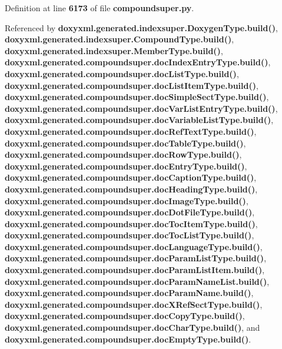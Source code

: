 Definition at line {\bf 6173} of file {\bf compoundsuper.\+py}.



Referenced by {\bf doxyxml.\+generated.\+indexsuper.\+Doxygen\+Type.\+build()}, {\bf doxyxml.\+generated.\+indexsuper.\+Compound\+Type.\+build()}, {\bf doxyxml.\+generated.\+indexsuper.\+Member\+Type.\+build()}, {\bf doxyxml.\+generated.\+compoundsuper.\+doc\+Index\+Entry\+Type.\+build()}, {\bf doxyxml.\+generated.\+compoundsuper.\+doc\+List\+Type.\+build()}, {\bf doxyxml.\+generated.\+compoundsuper.\+doc\+List\+Item\+Type.\+build()}, {\bf doxyxml.\+generated.\+compoundsuper.\+doc\+Simple\+Sect\+Type.\+build()}, {\bf doxyxml.\+generated.\+compoundsuper.\+doc\+Var\+List\+Entry\+Type.\+build()}, {\bf doxyxml.\+generated.\+compoundsuper.\+doc\+Variable\+List\+Type.\+build()}, {\bf doxyxml.\+generated.\+compoundsuper.\+doc\+Ref\+Text\+Type.\+build()}, {\bf doxyxml.\+generated.\+compoundsuper.\+doc\+Table\+Type.\+build()}, {\bf doxyxml.\+generated.\+compoundsuper.\+doc\+Row\+Type.\+build()}, {\bf doxyxml.\+generated.\+compoundsuper.\+doc\+Entry\+Type.\+build()}, {\bf doxyxml.\+generated.\+compoundsuper.\+doc\+Caption\+Type.\+build()}, {\bf doxyxml.\+generated.\+compoundsuper.\+doc\+Heading\+Type.\+build()}, {\bf doxyxml.\+generated.\+compoundsuper.\+doc\+Image\+Type.\+build()}, {\bf doxyxml.\+generated.\+compoundsuper.\+doc\+Dot\+File\+Type.\+build()}, {\bf doxyxml.\+generated.\+compoundsuper.\+doc\+Toc\+Item\+Type.\+build()}, {\bf doxyxml.\+generated.\+compoundsuper.\+doc\+Toc\+List\+Type.\+build()}, {\bf doxyxml.\+generated.\+compoundsuper.\+doc\+Language\+Type.\+build()}, {\bf doxyxml.\+generated.\+compoundsuper.\+doc\+Param\+List\+Type.\+build()}, {\bf doxyxml.\+generated.\+compoundsuper.\+doc\+Param\+List\+Item.\+build()}, {\bf doxyxml.\+generated.\+compoundsuper.\+doc\+Param\+Name\+List.\+build()}, {\bf doxyxml.\+generated.\+compoundsuper.\+doc\+Param\+Name.\+build()}, {\bf doxyxml.\+generated.\+compoundsuper.\+doc\+X\+Ref\+Sect\+Type.\+build()}, {\bf doxyxml.\+generated.\+compoundsuper.\+doc\+Copy\+Type.\+build()}, {\bf doxyxml.\+generated.\+compoundsuper.\+doc\+Char\+Type.\+build()}, and {\bf doxyxml.\+generated.\+compoundsuper.\+doc\+Empty\+Type.\+build()}.




